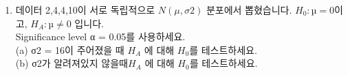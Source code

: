 \documentclass{article}
\newenvironment{solution}
{
    \par\medskip
    \noindent\textbf{Solution:}
    \begin{adjustwidth}{1em}{0em}
}
{
    \end{adjustwidth}
    \medskip
}
\begin{document}
\begin{enumerate}[label=\textbf{\arabic*.}, leftmargin=*]
    \begin{solution}
        $\theta$: 사람의 “true” IQ\\  
        모집단에서 true IQ의 prior: $\theta\sim N(100,15^2)$\\
        $X$: IQ 테스트 결과\\
        테스트는 true IQ에 random error를 더한 값이므로  
        $$  
        X\mid \theta\sim N(\theta,10^2)  
        $$  
        관측값: $X=120$  \\
        정규분포 prior와 정규분포 likelihood를 결합하면 posterior도 정규분포기 때문에 posterior variance:
        \begin{align*}
        \sigma_{\text{post}}^2&=\left(\frac1{15^2}+\frac1{10^2}\right)^{-1}\\  
        &=\left(\frac1{225}+\frac1{100}\right)^{-1}    \\
        &=\left(\frac{325}{22500}\right)^{-1}\\
        &=\frac{900}{13}             
        \end{align*}
 
        posterior mean:
        \begin{align*}
        \mu_{\text{post}}&=\sigma_{\text{post}}^2\left(\frac{100}{15^2}+\frac{120}{10^2}\right)  \\
        &=\frac{900}{13}\left(\frac{100}{225}+\frac{120}{100}\right)  \\
        &=\frac{900}{13}\left(\frac49+\frac65\right)=\frac{900}{13}\cdot\frac{74}{45}\\
        &=\frac{1480}{13}             
        \end{align*}

        따라서 posterior 분포:
        $$  
        \theta\mid X=120\sim N\left(\frac{1480}{13},\frac{900}{13}\right)  
        $$  
        즉 posterior pdf는  
        $$  
        f(\theta\mid X=120)=\frac{1}{\sqrt{2\pi\cdot\frac{900}{13}}}\exp\left(-\frac{\left(\theta-\frac{1480}{13}\right)^2}{2\cdot\frac{900}{13}}\right)  
        $$  
        입니다.  
        
    \end{solution}
    
\newpage
\item 데이터 2,4,4,10이 서로 독립적으로 $N(\mu,\sigma2)$ 분포에서 뽑혔습니다. $H_0: µ = 0$이고, $H_A: µ \neq 0$ 입니다.\\
Significance level α = 0.05를 사용하세요.\\
(a) σ2 = 16이 주어졌을 때 $H_A$ 에 대해 $H_0$를 테스트하세요.\\
(b) σ2가 알려져있지 않을때$H_A$ 에 대해 $H_0$를 테스트하세요.


\end{enumerate}
\end{document}
